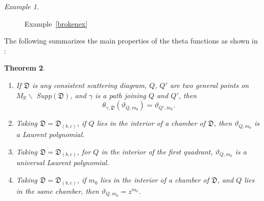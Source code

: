 \documentclass[12pt]{amsart}
\newtheorem{theorem}{Theorem}[section]
\theoremstyle{remark}
\newtheorem{example}[theorem]{Example}
\newcommand{\RR}{\mathbb{R}}
\newcommand{\DD}{\mathfrak{D}}
\begin{document}
\begin{example}
\begin{figure}
  \centering
  \caption{Example~\ref{brokenex}} 
  \label{figbrokenex}
\end{figure}

\end{example}

The following summarizes the main properties of the theta functions as shown in
\cite{GHKK}:





\begin{theorem} 
\begin{enumerate}
\item
If $\DD$ is any consistent scattering diagram,
$Q$, $Q'$ are two general points on $M_{\RR} \backslash$ Supp$(\DD)$, and 
$\gamma$ is a path joining $Q$ and $Q'$, then 
\[\theta_{\gamma, \DD }(\vartheta_{Q,m_0}) = \vartheta_{Q', m_0}. \]
\item Taking $\DD=\DD_{(b,c)}$, 
if $Q$ lies in the interior of a chamber of $\DD$, then 
$\vartheta_{Q,m_0}$ is a Laurent polynomial.
\item Taking $\DD=\DD_{(b,c)}$, for $Q$ in the interior of the first
quadrant, $\vartheta_{Q,m_0}$ is
a universal Laurent polynomial.
\item Taking $\DD=\DD_{(b,c)}$, if $m_0$ lies in the interior of a chamber of 
$\DD$, and $Q$ lies in the same chamber, then $\vartheta_{Q,m_0}=z^{m_0}$.
\end{enumerate}
\end{theorem}
\end{document}
